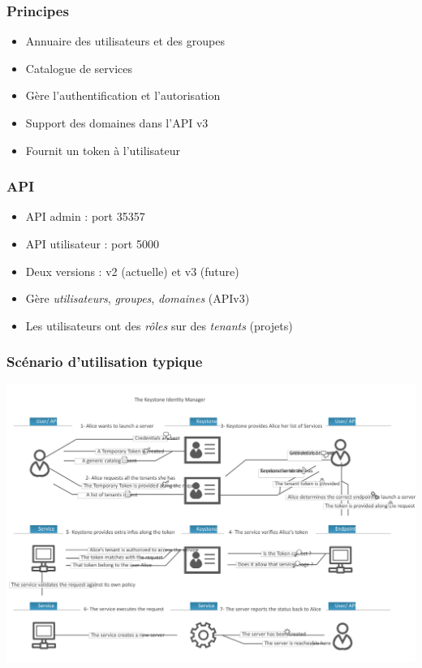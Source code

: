   \begin{frame}
    \frametitle{Principes}
    \begin{itemize}
      \item Annuaire des utilisateurs et des groupes
      \item Catalogue de services
      \item Gère l'authentification et l'autorisation
      \item Support des domaines dans l'API v3
      \item Fournit un token à l'utilisateur
    \end{itemize}
  \end{frame}

  \begin{frame}
    \frametitle{API}
    \begin{itemize}
      \item API admin : port 35357
      \item API utilisateur : port 5000
      \item Deux versions : v2 (actuelle) et v3 (future)
      \item Gère \textit{utilisateurs}, \textit{groupes}, \textit{domaines} (APIv3)
      \item Les utilisateurs ont des \textit{rôles} sur des \textit{tenants} (projets)
    \end{itemize}
  \end{frame}

  \begin{frame}
    \frametitle{Scénario d'utilisation typique}
    \includegraphics[width=\linewidth]{images/keystone-scenario.png}
  \end{frame}

